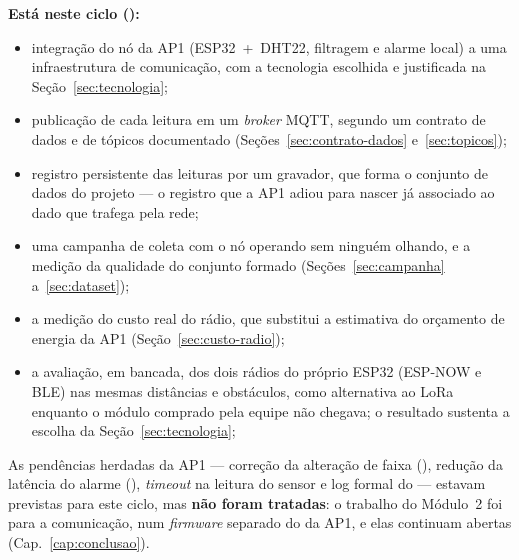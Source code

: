 \noindent\textbf{Está neste ciclo (\moduloDoCiclo):}
\begin{itemize}
  \item integração do nó da AP1 (ESP32~+~DHT22, filtragem e alarme local) a
    uma infraestrutura de comunicação, com a tecnologia escolhida e
    justificada na Seção~\ref{sec:tecnologia};
  \item publicação de cada leitura em um \emph{broker} MQTT, segundo um
    contrato de dados e de tópicos documentado
    (Seções~\ref{sec:contrato-dados} e~\ref{sec:topicos});
  \item registro persistente das leituras por um gravador, que forma o
    conjunto de dados do projeto --- o registro que a AP1 adiou para
    nascer já associado ao dado que trafega pela rede;
  \item uma campanha de coleta com o nó operando sem ninguém olhando,
    e a medição da qualidade do conjunto formado
    (Seções~\ref{sec:campanha} a~\ref{sec:dataset});
  \item a medição do custo real do rádio, que substitui a estimativa do
    orçamento de energia da AP1 (Seção~\ref{sec:custo-radio});
  \item a avaliação, em bancada, dos dois rádios do próprio ESP32 (ESP-NOW
    e BLE) nas mesmas distâncias e obstáculos, como alternativa ao LoRa
    enquanto o módulo comprado pela equipe não chegava; o resultado
    sustenta a escolha da Seção~\ref{sec:tecnologia};
\end{itemize}

\noindent As pendências herdadas da AP1 --- correção da alteração de
faixa (), redução da latência do alarme (),
\emph{timeout} na leitura do sensor e log formal do  --- estavam
previstas para este ciclo, mas \textbf{não foram tratadas}: o trabalho
do Módulo~2 foi para a comunicação, num \emph{firmware} separado do da
AP1, e elas continuam abertas (Cap.~\ref{cap:conclusao}).

